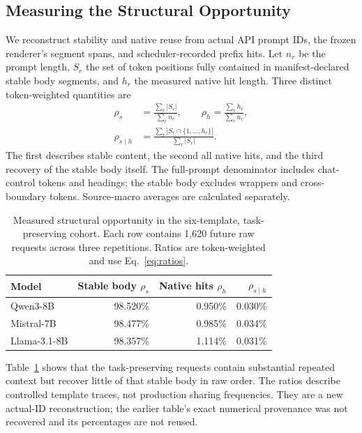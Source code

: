 \subsection{Measuring the Structural Opportunity}
We reconstruct stability and native reuse from actual API prompt IDs, the frozen renderer's segment spans, and scheduler-recorded prefix hits. Let $n_r$ be the prompt length, $S_r$ the set of token positions fully contained in manifest-declared stable body segments, and $h_r$ the measured native hit length. Three distinct token-weighted quantities are
\begin{equation}
\begin{aligned}
 \rho_s&=\frac{\sum_r |S_r|}{\sum_r n_r},\qquad
 \rho_h=\frac{\sum_r h_r}{\sum_r n_r},\\
 \rho_{s\mid h}&=\frac{\sum_r|S_r\cap\{1,\ldots,h_r\}|}{\sum_r|S_r|}.
\end{aligned}
\label{eq:ratios}
\end{equation}
The first describes stable content, the second all native hits, and the third recovery of the stable body itself. The full-prompt denominator includes chat-control tokens and headings; the stable body excludes wrappers and cross-boundary tokens. Source-macro averages are calculated separately.

\begin{table}[t]
\centering\small
\caption{Measured structural opportunity in the six-template, task-preserving cohort. Each row contains 1,620 future raw requests across three repetitions. Ratios are token-weighted and use Eq.~\eqref{eq:ratios}.}
\label{tab:motivation}
\begin{tabular}{@{}lrrr@{}}
\toprule
Model & Stable body $\rho_s$ & Native hits $\rho_h$ & $\rho_{s\mid h}$\\
\midrule
Qwen3-8B & 98.520\% & 0.950\% & 0.030\%\\
Mistral-7B & 98.477\% & 0.985\% & 0.034\%\\
Llama-3.1-8B & 98.357\% & 1.114\% & 0.031\%\\
\bottomrule
\end{tabular}
\end{table}

Table~\ref{tab:motivation} shows that the task-preserving requests contain substantial repeated context but recover little of that stable body in raw order. The ratios describe controlled template traces, not production sharing frequencies. They are a new actual-ID reconstruction; the earlier table's exact numerical provenance was not recovered and its percentages are not reused.

